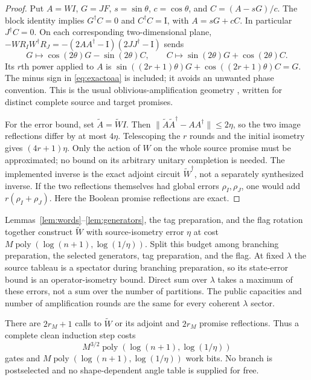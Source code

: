\documentclass[11pt]{article}
\theoremstyle{definition}
\newcommand{\norm}[1]{\lVert #1\rVert}
\newcommand{\Id}{\mathrm I}
\newcommand{\poly}{\operatorname{poly}}
\begin{document}
\begin{proof}
Put $A=WI$, $G=JF$, $s=\sin\theta$, $c=\cos\theta$, and
$C=(A-sG)/c$. The block identity implies $G^\dagger C=0$ and
$C^\dagger C=\Id$, with $A=sG+cC$. In particular $J^\dagger C=0$.
On each corresponding two-dimensional plane,
$-WR_IW^\dagger R_J=-(2AA^\dagger-\Id)(2JJ^\dagger-\Id)$ sends
\[
 G\mapsto\cos(2\theta)G-\sin(2\theta)C,\qquad
 C\mapsto\sin(2\theta)G+\cos(2\theta)C.
\]
Its $r$th power applied to $A$ is
$\sin((2r+1)\theta)G+\cos((2r+1)\theta)C=G$.
The minus sign in \eqref{eq:exactoaa} is included; it avoids an unwanted
phase convention. This is the usual oblivious-amplification geometry
\cite{oaa}, written for distinct complete source and target promises.

For the error bound, set $\widetilde A=\widetilde W I$. Then
$\norm{\widetilde A\widetilde A^\dagger-AA^\dagger}\le2\eta$,
so the two image reflections differ by at most $4\eta$. Telescoping
the $r$ rounds and the initial isometry gives $(4r+1)\eta$.
Only the action of $W$ on the whole source promise must be approximated;
no bound on its arbitrary unitary completion is needed. The implemented
inverse is the exact adjoint circuit $\widetilde W^\dagger$, not a
separately synthesized inverse. If the two reflections themselves had
global errors $\rho_I,\rho_J$, one would add $r(\rho_I+\rho_J)$.
Here the Boolean promise reflections are exact.
\end{proof}

Lemmas~\ref{lem:words}--\ref{lem:generators}, the tag preparation, and the
flag rotation together construct $\widetilde W$ with source-isometry
error $\eta$ at cost $M\poly(\log(n+1),\log(1/\eta))$. Split this budget
among branching preparation, the selected generators, tag preparation,
and the flag. At fixed $\lambda$ the source tableau is a spectator during
branching preparation, so its state-error bound is an operator-isometry
bound. Direct sum over $\lambda$ takes a maximum of these errors, not a
sum over the number of partitions. The public capacities and number of
amplification rounds are the same for every coherent $\lambda$ sector.

There are $2r_M+1$ calls to $\widetilde W$ or its adjoint and $2r_M$
promise reflections. Thus a complete clean induction step costs
\begin{equation}\label{eq:stagecost}
 M^{3/2}\poly(\log(n+1),\log(1/\eta))
\end{equation}
gates and $M\poly(\log(n+1),\log(1/\eta))$ work bits. No branch is
postselected and no shape-dependent angle table is supplied for free.
\end{document}

